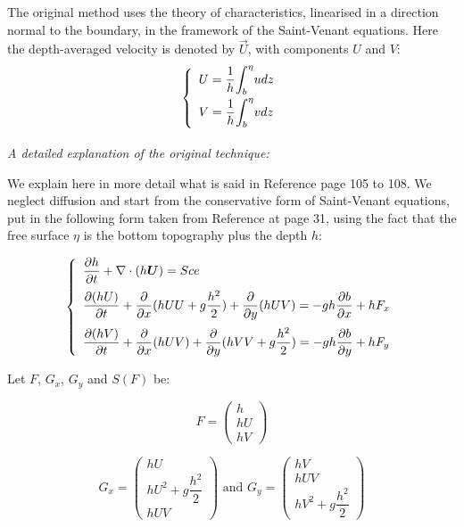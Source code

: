 The original method \cite{thompson} uses the theory of
characteristics, linearised in a direction normal to the boundary,
in the framework of the Saint-Venant equations. Here the depth-averaged
velocity is denoted by $\vec{U}$, with components $U$ and $V$:
\begin{equation}
\left\{\begin{array}{l}
U = \dfrac{1}{h}\displaystyle{\int_b^\eta}u dz \smallskip \\
V = \dfrac{1}{h}\displaystyle{\int_b^\eta}v dz \smallskip
\end{array}\right.
\end{equation}

\textit{A detailed explanation of the original technique:} \smallskip

We explain here in more detail what is said in Reference \cite{hervouet007} page
105 to 108. We neglect diffusion and start from the conservative form of
Saint-Venant equations, put in the following form taken from Reference \cite%
{hervouet007} at page 31, using the fact that the free surface $\eta$ is the
bottom topography plus the depth $h$:

\begin{equation}\label{svt}
\left\{\begin{array}{l}
\dfrac{\partial h}{\partial t}+\Div(h\vec{U})=Sce \medskip \\
\dfrac{\partial (hU)}{\partial t}+\dfrac{\partial }{\partial x}(hUU+g\dfrac{%
h^{2}}{2})+\dfrac{\partial }{\partial y}(hUV)=-gh\dfrac{\partial b}{%
\partial x}+hF_{x} \medskip \\
\dfrac{\partial (hV)}{\partial t}+\dfrac{\partial }{\partial x}(hUV)+\dfrac{%
\partial }{\partial y}(hVV+g\dfrac{h^{2}}{2})=-gh\dfrac{\partial b}{%
\partial y}+hF_{y}  
\end{array}\right.
\end{equation}

Let $F$, $G_{x}$, $G_{y}$ and $S(F)$ be:

\begin{equation*}
F=\left( 
\begin{array}{c}
h \\ 
hU \\ 
hV%
\end{array}
\right)
\end{equation*}

\begin{equation*}
G_{x}=\left( 
\begin{array}{c}
hU \\ 
hU^{2}+g\dfrac{h^{2}}{2} \\ 
hUV%
\end{array}
\right) \text{ and }G_{y}=\left( 
\begin{array}{c}
hV \\ 
hUV \\ 
hV^{2}+g\dfrac{h^{2}}{2}%
\end{array}
\right)
\end{equation*}

